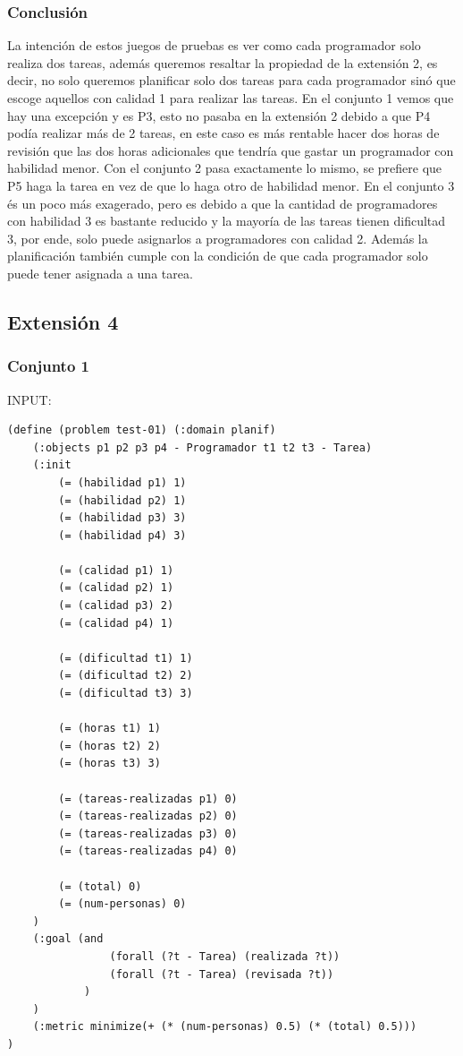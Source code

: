 \documentclass[12pt, titlepage]{article}
\begin{document}
\subsubsection{Conclusión}

La intención de estos juegos de pruebas es ver como cada programador solo realiza dos tareas, además queremos resaltar la propiedad de la extensión 2, es decir, no solo queremos planificar solo dos tareas para cada programador sinó que escoge aquellos con calidad 1 para realizar las tareas. En el conjunto 1 vemos que hay una excepción y es P3, esto no pasaba en la extensión 2 debido a que P4 podía realizar más de 2 tareas, en este caso es más rentable hacer dos horas de revisión que las dos horas adicionales que tendría que gastar un programador con habilidad menor. Con el conjunto 2 pasa exactamente lo mismo, se prefiere que P5 haga la tarea en vez de que lo haga otro de habilidad menor. En el conjunto 3 és un poco más exagerado, pero es debido a que la cantidad de programadores con habilidad 3 es bastante reducido y la mayoría de las tareas tienen dificultad 3, por ende, solo puede asignarlos a programadores con calidad 2. Además la planificación también cumple con la condición de que cada programador solo puede tener asignada a una tarea.

\subsection{Extensión 4}

\subsubsection*{Conjunto 1}

INPUT:
\begin{lstlisting}[language=PDDL]
(define (problem test-01) (:domain planif)
    (:objects p1 p2 p3 p4 - Programador t1 t2 t3 - Tarea)
    (:init
        (= (habilidad p1) 1)
        (= (habilidad p2) 1)
        (= (habilidad p3) 3)
        (= (habilidad p4) 3)
        
        (= (calidad p1) 1)
        (= (calidad p2) 1)
        (= (calidad p3) 2)
        (= (calidad p4) 1)
        
        (= (dificultad t1) 1)
        (= (dificultad t2) 2)
        (= (dificultad t3) 3)
        
        (= (horas t1) 1)
        (= (horas t2) 2)
        (= (horas t3) 3)

        (= (tareas-realizadas p1) 0)
        (= (tareas-realizadas p2) 0)
        (= (tareas-realizadas p3) 0)
        (= (tareas-realizadas p4) 0)
        
        (= (total) 0)
        (= (num-personas) 0)
    )
    (:goal (and
                (forall (?t - Tarea) (realizada ?t))
                (forall (?t - Tarea) (revisada ?t))
            )
    )
    (:metric minimize(+ (* (num-personas) 0.5) (* (total) 0.5)))
)
\end{lstlisting}
\end{document}
